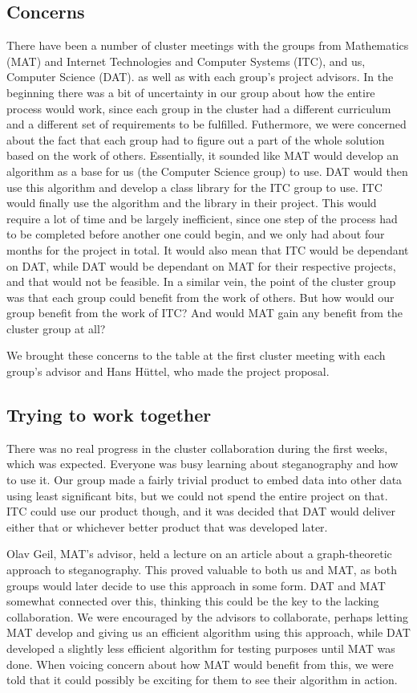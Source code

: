 \subsection*{Concerns}
There have been a number of cluster meetings with the groups from Mathematics (MAT) and Internet Technologies and Computer Systems (ITC), and us, Computer Science (DAT). as well as with each group's project advisors.
In the beginning there was a bit of uncertainty in our group about how the entire process would work, since each group in the cluster had a different curriculum and a different set of requirements to be fulfilled.
Futhermore, we were concerned about the fact that each group had to figure out a part of the whole solution based on the work of others.
Essentially, it sounded like MAT would develop an algorithm as a base for us (the Computer Science group) to use.
DAT would then use this algorithm and develop a class library for the ITC group to use.
ITC would finally use the algorithm and the library in their project.
This would require a lot of time and be largely inefficient, since one step of the process had to be completed before another one could begin, and we only had about four months for the project in total.
It would also mean that ITC would be dependant on DAT, while DAT would be dependant on MAT for their respective projects, and that would not be feasible.
In a similar vein, the point of the cluster group was that each group could benefit from the work of others.
But how would our group benefit from the work of ITC? And would MAT gain any benefit from the cluster group at all?

We brought these concerns to the table at the first cluster meeting with each group's advisor and Hans Hüttel, who made the project proposal.

\subsection*{Trying to work together}
There was no real progress in the cluster collaboration during the first weeks, which was expected.
Everyone was busy learning about steganography and how to use it.
Our group made a fairly trivial product to embed data into other data using least significant bits, but we could not spend the entire project on that.
ITC could use our product though, and it was decided that DAT would deliver either that or whichever better product that was developed later.

Olav Geil, MAT's advisor, held a lecture on an article about a graph-theoretic approach to steganography.
This proved valuable to both us and MAT, as both groups would later decide to use this approach in some form.
DAT and MAT somewhat connected over this, thinking this could be the key to the lacking collaboration.
We were encouraged by the advisors to collaborate, perhaps letting MAT develop and giving us an efficient algorithm using this approach, while DAT developed a slightly less efficient algorithm for testing purposes until MAT was done.
When voicing concern about how MAT would benefit from this, we were told that it could possibly be exciting for them to see their algorithm in action.

